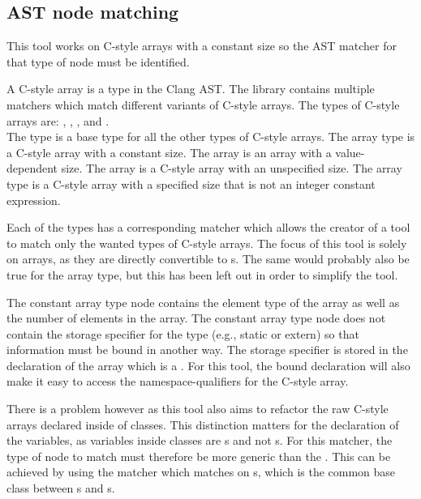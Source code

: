 \subsection{AST node matching}\label{subsec:085tool_example:030cstyle:node_matching}

This tool works on C-style arrays with a constant size so the AST matcher for that type of node must be identified.

A C-style array is a type in the Clang AST. The library contains multiple matchers which match different variants of C-style arrays. The types of C-style arrays are: , , ,  and . \\
The  type is a base type for all the other types of C-style arrays. The  array type is a C-style array with a constant size. The  array is an array with a value-dependent size. The  array is a C-style array with an unspecified size. The  array type is a C-style array with a specified size that is not an integer constant expression.

Each of the types has a corresponding matcher which allows the creator of a tool to match only the wanted types of C-style arrays. The focus of this tool is solely on  arrays, as they are directly convertible to s. The same would probably also be true for the  array type, but this has been left out in order to simplify the tool.

The constant array type node contains the element type of the array as well as the number of elements in the array. The constant array type node does not contain the storage specifier for the type (e.g., static or extern) so that information must be bound in another way. The storage specifier is stored in the declaration of the array which is a . For this tool, the bound declaration will also make it easy to access the namespace-qualifiers for the C-style array. 

There is a problem however as this tool also aims to refactor the raw C-style arrays declared inside of classes. This distinction matters for the declaration of the variables, as variables inside classes are s and not s. For this matcher, the type of node to match must therefore be more generic than the . This can be achieved by using the  matcher which matches on s, which is the common base class between s and s.

